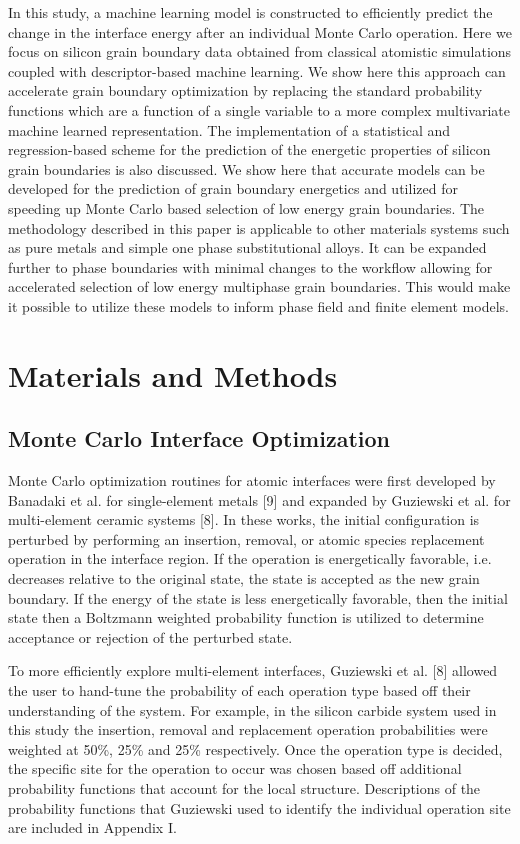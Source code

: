 \documentclass[aip,reprint,longbibliography,amsmath,amssymb,twocolumn,superscriptaddress]{revtex4-1}
\begin{document}
In this study, a machine learning model is constructed to efficiently predict the change in the interface energy after an individual Monte Carlo operation. 
%
Here we focus on silicon grain boundary data obtained from classical atomistic simulations coupled with descriptor-based machine learning. 
%
We show here this approach can accelerate grain boundary optimization  by replacing the standard probability functions which are a function of a single variable to a more complex multivariate machine learned representation. 
%
The implementation of a statistical and regression-based scheme for the prediction of the energetic properties of silicon grain boundaries is also discussed. 
%
We show here that accurate models can be developed for the prediction of grain boundary energetics and utilized for speeding up Monte Carlo based selection of low energy grain boundaries.  
%
The methodology described in this paper is applicable to other materials systems such as pure metals and simple one phase substitutional alloys. 
%
It can be expanded further to phase boundaries with minimal changes to the workflow allowing for accelerated selection of low energy multiphase grain boundaries. This would make it possible to utilize these models to inform phase field and finite element models. 

\section{Materials and Methods}
\subsection{Monte Carlo Interface Optimization}

Monte Carlo optimization routines for atomic interfaces were first developed by Banadaki et al. for single-element metals [9] and expanded by Guziewski et al. for multi-element ceramic systems [8].  
%
In these works, the initial configuration is perturbed by performing an insertion, removal, or atomic species replacement operation in the interface region. 
%
If the operation is energetically favorable, i.e. decreases relative to the original state, the state is accepted as the new grain boundary. 
%
If the energy of the state is less energetically favorable, then the initial state then a Boltzmann weighted probability function is utilized to determine acceptance or rejection of the perturbed state. 


To more efficiently explore multi-element interfaces, Guziewski et al. [8] allowed the user to hand-tune the probability of each operation type based off their understanding of the system. 
%
For example, in the silicon carbide system used in this study the insertion, removal and replacement operation probabilities were weighted at 50\%, 25\% and 25\% respectively. 
%
Once the operation type is decided, the specific site for the operation to occur was chosen based off additional probability functions that account for the local structure.  
%
Descriptions of the probability functions that Guziewski used to identify the individual operation site are included in Appendix I.  
\end{document}
